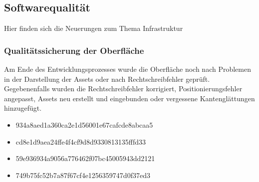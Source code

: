 \subsection{Softwarequalität}
Hier finden sich die Neuerungen zum Thema Infrastruktur

\subsubsection{Qualitätssicherung der Oberfläche}
Am Ende des Entwicklungsprozesses wurde die Oberfläche noch nach Problemen in der Darstellung der Assets oder nach Rechtschreibfehler geprüft. Gegebenenfalls wurden die Rechtschreibfehler korrigiert, Positionierungsfehler angepasst, Assets neu erstellt und eingebunden oder vergessene Kantenglättungen hinzugefügt. 
\begin{itemize}
\item 934a8aed1a360ca2e1d56001e67cafcde8abcaa5
\item cd8e1d9aea24ffe4f4cf9d8d9330813135fffd33
\item 59e936934a9056a776462f07bc45005943dd2121
\item 749b75fc52b7a87f67cf4e1256359747d0f37ed3
\end{itemize}